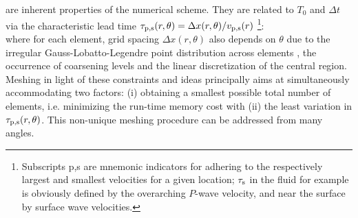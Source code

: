 are inherent properties of the numerical scheme.
They are related to $T_0$ and $\Delta t$ via the 
characteristic lead time $\tau_{\rm p,s}(r,\theta)=\Delta x(r,\theta)/v_{\rm p,s}(r)$
\footnote{Subscripts p,s are mnemonic indicators for adhering to the respectively 
largest and smallest velocities for a given location; $\tau_{\rm s}$ in the fluid for example
is obviously defined by the overarching $P$-wave velocity, and near the surface by surface 
wave velocities.}:
%
\eqa 
{} \label{eq:period}\\
\label{eq:timestep}
\ena
%
where for each element, grid spacing $\Delta x(r,\theta)$ also depends on $\theta$ due to the 
irregular Gauss-Lobatto-Legendre point distribution across elements \citep{nissen+:07b}, 
the occurrence of coarsening levels and the linear discretization of the central region.
Meshing in light of these constraints and ideas 
principally aims at simultaneously 
accommodating two factors: 
(i) obtaining a smallest possible total number of elements, i.e. minimizing 
the run-time memory cost with 
(ii) the least variation in $\tau_{\rm p,s}(r,\theta)$. 
This non-unique meshing procedure can be addressed from many angles.
%
